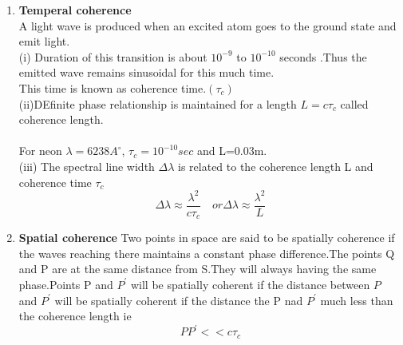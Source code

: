 \begin{enumerate}
	\item \textbf{Temperal coherence}\\
	 A light wave is produced when an excited atom goes to the ground state and emit light.\\
	 (i) Duration of this transition is about $10^{-9}$ to $10^{-10}$ seconds .Thus the emitted wave remains sinusoidal for this much time.\\This time is known as coherence time.$(\tau_c)$\\
	 (ii)DEfinite phase relationship is maintained for a length $L=c\tau_c$ called coherence length.\\\\
	 For neon $\lambda=6238 A^{\circ}$, $\tau_c=10^{-10} sec$ and L=0.03m.\\
	 (iii) The spectral line width $\Delta \lambda$ is related to the coherence length L and coherence time $\tau_c$
	 $$\Delta\lambda\approx\frac{\lambda^2}{c\tau_c} \quad or \Delta\lambda\approx\frac{\lambda^2}{L}$$
	 \item \textbf{ Spatial coherence}
	 Two points in space are said to be spatially coherence if the waves reaching there maintains a constant phase difference.The points Q  and P are at the same distance from S.They will always having the same phase.Points P and $P^{\prime}$ will be spatially coherent if the distance between $P$ and $P^{\prime}$  will be spatially coherent if the distance the P nad $P^{\prime}$ much less than the coherence length ie $$PP^{\prime}<<c\tau_c$$
\end{enumerate}




